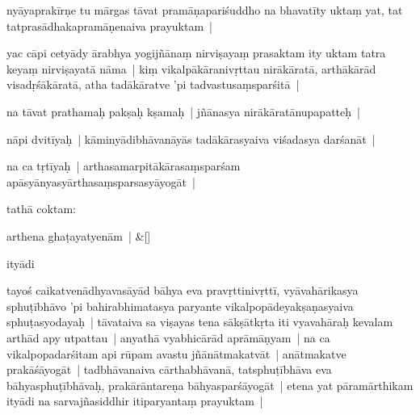 \documentclass[article,12pt,a4paper]{memoir}%
\newcounter{parCount}
\begin{document}
	  
	  \pstart \leavevmode%
	\label{thakur75-20.21}nyāyaprakīrṇe tu mārgas tāvat pramāṇapariśuddho na bhavatīty uktaṃ yat, tat tatprasādhakapramāṇenaiva prayuktam | 
	{}
	\pend%
      

	  
	  \pstart \leavevmode%
	\label{thakur75-20.23}yac cāpi cetyādy ārabhya yogijñānaṃ nirviṣayaṃ prasaktam ity uktam tatra keyaṃ nirviṣayatā nāma | kiṃ vikalpākāranivṛttau nirākāratā, arthākārād visadṛśākāratā, atha tadākāratve 'pi tadvastusaṃsparśitā | 
	{}
	\pend%
      

	  
	  \pstart \leavevmode%
	na tāvat prathamaḥ pakṣaḥ kṣamaḥ | jñānasya nirākāratānupapatteḥ | 
	{}
	\pend%
      

	  
	  \pstart \leavevmode%
	nāpi dvitīyaḥ | kāminyādibhāvanāyās tadākārasyaiva viśadasya darśanāt | 
	{}
	\pend%
      

	  
	  \pstart \leavevmode%
	na ca tṛtīyaḥ | arthasamarpitākārasaṃsparśam apāsyānyasyārthasaṃsparsasyāyogāt | 
	{}
	\pend%
      

	  
	  \pstart \leavevmode%
	tathā coktam:
	{}
	\pend%
      
	    
	    \stanza[\smallbreak]
	  arthena ghaṭayatyenām | \&[\smallbreak]
	  
	  
	  

	  
	  \pstart \leavevmode%
	ityādi
	{}
	\pend%
      

	  
	  \pstart \leavevmode%
	tayoś caikatvenādhyavasāyād bāhya eva pravṛttinivṛttī, vyāvahārikasya sphuṭībhāvo 'pi bahirabhimatasya paryante vikalpopādeyakṣaṇasyaiva sphuṭasyodayaḥ | tāvataiva sa viṣayas tena sākṣātkṛta iti vyavahāraḥ kevalam arthād apy utpattau | anyathā vyabhicārād aprāmāṇyam | na ca vikalpopadarśitam api rūpam avastu jñānātmakatvāt | anātmakatve prakāśāyogāt | tadbhāvanaiva cārthabhāvanā, tatsphuṭībhāva eva bāhyasphuṭībhāvaḥ, prakārāntareṇa bāhyasparśāyogāt | etena yat pāramārthikam ityādi na sarvajñasiddhir itiparyantaṃ prayuktam | 
	{}
	\pend%
      
\end{document}
